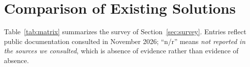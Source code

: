 \documentclass[conference,letterpaper]{IEEEtran}
\begin{document}
\onecolumn
\appendices

\section{Comparison of Existing Solutions}\label{app:matrix}

Table~\ref{tab:matrix} summarizes the survey of Section~\ref{sec:survey}.
Entries reflect public documentation consulted in November 2026; ``n/r''
means \emph{not reported in the sources we consulted}, which is absence of
evidence rather than evidence of absence.
\end{document}
